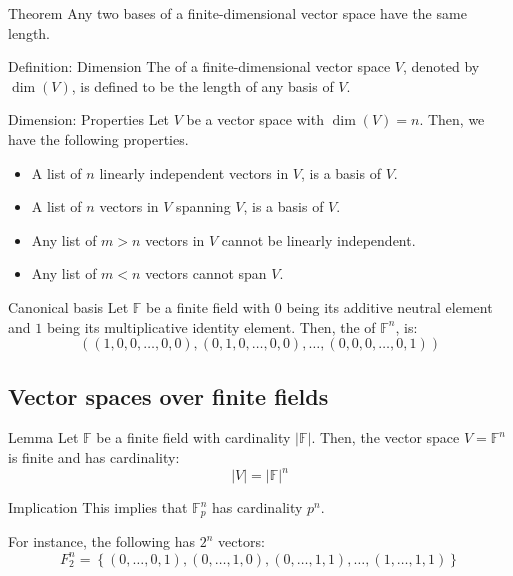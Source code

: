 \documentclass[a4paper]{article}
\begin{document}
\begin{parag}{Theorem}
    Any two bases of a finite-dimensional vector space have the same length.
\end{parag}

\begin{parag}{Definition: Dimension}
    The  of a finite-dimensional vector space $V$, denoted by $\dim\left(V\right)$, is defined to be the length of any basis of $V$.

\end{parag}

\begin{parag}{Dimension: Properties}
    Let $V$ be a vector space with $\dim\left(V\right) = n$. Then, we have the following properties.

    \begin{itemize}
        \item A list of $n$ linearly independent vectors in $V$, is a basis of $V$.
        \item A list of $n$ vectors in $V$ spanning $V$, is a basis of $V$.
        \item Any list of $m > n$ vectors in $V$ cannot be linearly independent.
        \item Any list of $m < n$ vectors cannot span $V$.
    \end{itemize}
    
\end{parag}

\begin{parag}{Canonical basis}
    Let $\mathbb{F}$ be a finite field with $0$ being its additive neutral element and $1$ being its multiplicative identity element. Then, the  of $\mathbb{F}^n$, is: 
    \[\left(\left(1, 0, 0, \ldots, 0, 0\right), \left(0, 1, 0, \ldots, 0, 0\right), \ldots, \left(0, 0, 0, \ldots, 0, 1\right)\right)\]
\end{parag}

\subsection{Vector spaces over finite fields}
\begin{parag}{Lemma}
    Let $\mathbb{F}$ be a finite field with cardinality $\left|\mathbb{F}\right|$. Then, the vector space $V = \mathbb{F}^n$ is finite and has cardinality: 
    \[\left|V\right| = \left|\mathbb{F}\right|^n\]

    \begin{subparag}{Implication}
        This implies that $\mathbb{F}_p^n$ has cardinality $p^n$.

        For instance, the following has $2^n$ vectors: 
        \[F_2^n = \left\{\left(0, \ldots, 0, 1\right), \left(0, \ldots, 1, 0\right), \left(0, \ldots, 1, 1\right), \ldots, \left(1, \ldots, 1, 1\right)\right\}\]
    \end{subparag}
\end{parag}
\end{document}
